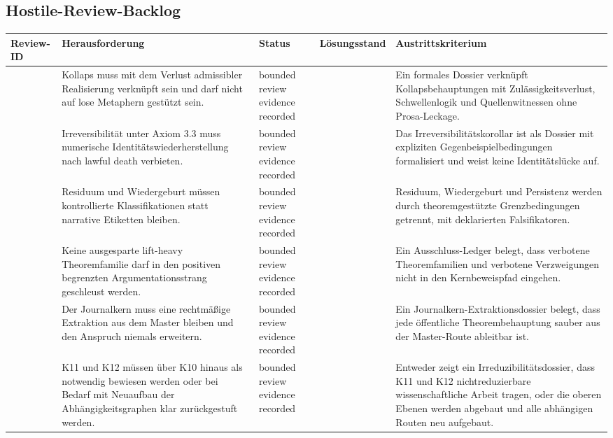 \subsection{Hostile-Review-Backlog}
\begin{center}
\begin{tabular}{@{}L{0.18\textwidth}L{0.25\textwidth}L{0.11\textwidth}L{0.15\textwidth}L{0.23\textwidth}@{}}
\toprule
Review-ID & Herausforderung & Status & Lösungsstand & Austrittskriterium \\
\midrule
{} & Kollaps muss mit dem Verlust admissibler Realisierung verknüpft sein und darf nicht auf lose Metaphern gestützt sein. & bounded review evidence recorded &  & Ein formales Dossier verknüpft Kollapsbehauptungen mit Zulässigkeitsverlust, Schwellenlogik und Quellenwitnessen ohne Prosa-Leckage. \\
 & Irreversibilität unter Axiom 3.3 muss numerische Identitätswiederherstellung nach lawful death verbieten. & bounded review evidence recorded &  & Das Irreversibilitätskorollar ist als Dossier mit expliziten Gegenbeispielbedingungen formalisiert und weist keine Identitätslücke auf. \\
 & Residuum und Wiedergeburt müssen kontrollierte Klassifikationen statt narrative Etiketten bleiben. & bounded review evidence recorded &  & Residuum, Wiedergeburt und Persistenz werden durch theoremgestützte Grenzbedingungen getrennt, mit deklarierten Falsifikatoren. \\
 & Keine ausgesparte lift-heavy Theoremfamilie darf in den positiven begrenzten Argumentationsstrang geschleust werden. & bounded review evidence recorded &  & Ein Ausschluss-Ledger belegt, dass verbotene Theoremfamilien und verbotene Verzweigungen nicht in den Kernbeweispfad eingehen. \\
 & Der Journalkern muss eine rechtmäßige Extraktion aus dem Master bleiben und den Anspruch niemals erweitern. & bounded review evidence recorded &  & Ein Journalkern-Extraktionsdossier belegt, dass jede öffentliche Theorembehauptung sauber aus der Master-Route ableitbar ist. \\
 & K11 und K12 müssen über K10 hinaus als notwendig bewiesen werden oder bei Bedarf mit Neuaufbau der Abhängigkeitsgraphen klar zurückgestuft werden. & bounded review evidence recorded &  & Entweder zeigt ein Irreduzibilitätsdossier, dass K11 und K12 nichtreduzierbare wissenschaftliche Arbeit tragen, oder die oberen Ebenen werden abgebaut und alle abhängigen Routen neu aufgebaut. \\
\bottomrule
\end{tabular}
\end{center}

